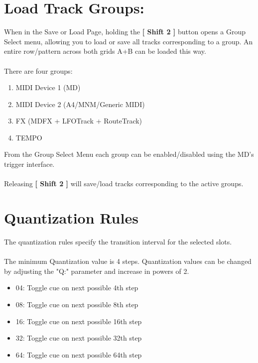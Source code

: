 \section{Load Track Groups:}
When in the Save or Load Page, holding the \textbf{[ Shift 2 ]} button opens a Group Select menu,
allowing you to load or save all tracks corresponding to a group. An entire row/pattern across both grids A+B can be loaded this way.\\
\\
There are four groups:
\begin{enumerate}
    \item MIDI Device 1 (MD)
    \item MIDI Device 2 (A4/MNM/Generic MIDI)
    \item FX (MDFX + LFOTrack + RouteTrack)
    \item TEMPO
\end{enumerate}
From the Group Select Menu each group can be enabled/disabled using the MD's trigger interface.\\
\\
Releasing \textbf{[ Shift 2 ]} will save/load tracks corresponding to the active groups.
\section{Quantization Rules}
The quantization rules specify the transition interval for the selected slots.\\
\\
The minimum Quantization value is 4 steps. Quantization values can be changed by adjusting the "Q:" parameter and increase in powers of 2.\\
\begin{itemize}
\item 04: Toggle cue on next possible 4th step
\item 08: Toggle cue on next possible 8th step 
\item 16: Toggle cue on next possible 16th step 
\item 32: Toggle cue on next possible 32th step 
\item 64: Toggle cue on next possible 64th step
\end{itemize}

